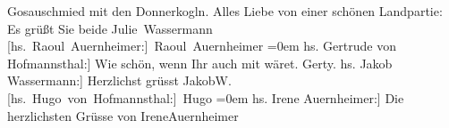 \begin{ledgroupsized}[t]{13cm}
{{                        Gosauschmied mit den Donnerkogln.}}\pend
           \pstart
           {\pb}Alles Liebe von einer schönen Landpartie:
               Es grüßt Sie beide \pend
           \pstart
           \spacefill\mbox{Julie Wassermann}{\\[\baselineskip]}\spacefill\mbox{{[}hs. Raoul Auernheimer:{]} Raoul Auernheimer}\pend
           \leftskip=0em{}\pstart
           \noindent{}{[}hs. Gertrude von Hofmannsthal:{]} Wie schön, wenn Ihr auch mit wäret. \pend
           \pstart \spacefill\mbox{Gerty.}\pend{}\pstart
           \noindent{}{[}hs. Jakob Wassermann:{]} Herzlichst grüsst \pend
           \pstart
           \spacefill\mbox{JakobW.}{\\[\baselineskip]}\spacefill\mbox{{[}hs. Hugo von Hofmannsthal:{]} Hugo}\pend
           \leftskip=0em{}\pstart
           \noindent{}{[}hs. Irene Auernheimer:{]} Die herzlichsten Grüsse von \pend
           \pstart \spacefill\mbox{IreneAuernheimer}\pend{}
         
         \endnumbering{}\end{ledgroupsized}  \newcommand{\dateiname}{L01957}\newcommand{\titel}{Julie und Jakob Wassermann, Irene und Raoul Auernheimer, Gerty und Hugo von Hofmannsthal an Arthur und Olga Schnitzler, 20. 9. 1910}\newcommand{\editorInnen}{Martin Anton Müller und Gerd-Hermann Susen}
      